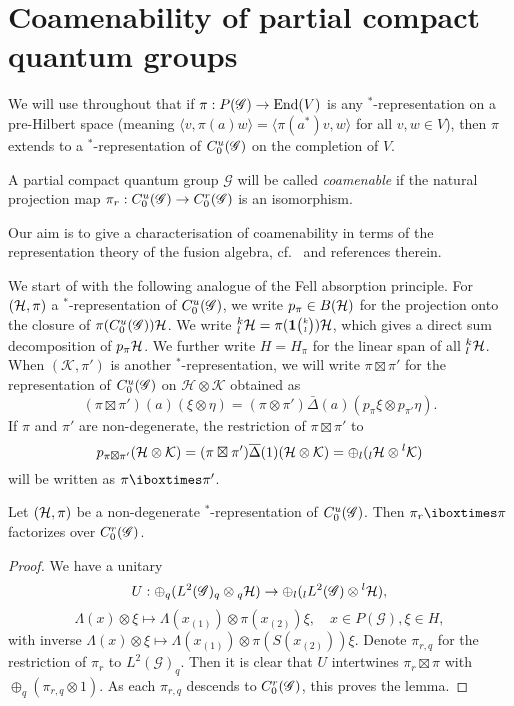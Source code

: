 \section{Coamenability of partial compact quantum groups}

We will use throughout that if $\pi: P(\mathscr{G}) \rightarrow \operatorname{\mathrm{End}}(V)$ is any $^*$-representation on a pre-Hilbert space (meaning $\langle v,\pi(a)w\rangle = \langle \pi(a^*)v,w\rangle$ for all $v,w\in V$), then $\pi$ extends to a $^*$-representation of $C^{u}_{0}(\mathscr{G})$ on the completion of $V$.

\begin{Def} A partial compact quantum group $\mathscr{G}$ will be called \emph{coamenable} if the natural projection map $\pi_r:C^{u}_{0}(\mathscr{G})\rightarrow C^{r}_{0}(\mathscr{G})$ is an isomorphism.
\end{Def}

Our aim is to give a characterisation of coamenability in terms of the representation theory of the fusion algebra, cf.~ \cite{Kye1} and references therein.

We start of with the following analogue of the Fell absorption principle. For $(\mathcal{H},\pi)$ a $^*$-representation of $C^{u}_{0}(\mathscr{G})$, we write $p_{\pi}\in B(\mathcal{H})$ for the projection onto the closure of $\pi(C^{u}_{0}(\mathscr{G}))\mathcal{H}$. We write ${}^{k}_{l}\mathcal{H} = \pi(\mathbf{1}{\tiny {\begin{pmatrix} k\\l\end{pmatrix}}})\mathcal{H}$, which gives a direct sum decomposition of $p_{\pi}\mathcal{H}$. We further write $H=H_{\pi}$ for the linear span of all ${}^{k}_{l}\mathcal{H}$. When $(\mathcal{K},\pi')$ is another $^*$-representation, we will write $\pi \boxtimes \pi'$ for the representation of $C^{u}_{0}(\mathscr{G})$ on $\mathcal{H}\otimes \mathcal{K}$ obtained as \[(\pi \boxtimes \pi')(a)(\xi\otimes \eta) = (\pi\otimes \pi')\bar{\Delta}(a)(p_{\pi}\xi\otimes p_{\pi'}\eta).\] If $\pi$ and $\pi'$ are non-degenerate, the restriction of $\pi\boxtimes \pi'$ to \[p_{\pi \boxtimes \pi'}(\mathcal{H}\otimes \mathcal{K}) = (\pi \boxtimes \pi')\overline{\Delta}(1)(\mathcal{H}\otimes \mathcal{K})= \oplus_l ({}_l\mathcal{H}\otimes {}^l\mathcal{K})\] will be written as $\pi\iboxtimes \pi'$. 

\begin{Lem} Let $(\mathcal{H},\pi)$ be a non-degenerate $^*$-representation of $C^{u}_{0}(\mathscr{G})$. Then $\pi_r\iboxtimes \pi$ factorizes over $C^{r}_{0}(\mathscr{G})$.
\end{Lem}

\begin{proof}  We have a unitary \[U: \oplus_q (L^2(\mathscr{G})_q\otimes {}_q\mathcal{H} ) \rightarrow \oplus_l ({}_l L^2(\mathscr{G})\otimes {}^l\mathcal{H}),\]\[\Lambda(x)\otimes \xi \mapsto \Lambda(x_{(1)})\otimes \pi(x_{(2)})\xi,\quad x\in P(\mathscr{G}),\xi\in H,\] with inverse $\Lambda(x)\otimes \xi \mapsto \Lambda(x_{(1)})\otimes \pi(S(x_{(2)}))\xi$. Denote $\pi_{r,q}$ for the restriction of $\pi_r$ to $L^2(\mathscr{G})_q$. Then it is clear that $U$ intertwines $\pi_r\boxtimes \pi$ with $\oplus_q (\pi_{r,q}\otimes 1)$. As each $\pi_{r,q}$ descends to $C^{r}_{0}(\mathscr{G})$, this proves the lemma.
\end{proof} 

